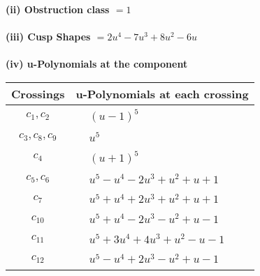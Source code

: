 \documentclass[1p]{elsarticle_modified}
\theoremstyle{definition}
\begin{document}
\flushleft \textbf{(ii) Obstruction class $= 1$}\\~\\
\flushleft \textbf{(iii) Cusp Shapes $= 2 u^4-7 u^3+8 u^2-6 u$}\\~\\
\newpage\renewcommand{\arraystretch}{1}
\flushleft \textbf{(iv) u-Polynomials at the component}\newline \\
\begin{tabular}{m{50pt}|m{274pt}}
Crossings & \hspace{64pt}u-Polynomials at each crossing \\
\hline $$\begin{aligned}c_{1},c_{2}\end{aligned}$$&$\begin{aligned}
&(u-1)^5
\end{aligned}$\\
\hline $$\begin{aligned}c_{3},c_{8},c_{9}\end{aligned}$$&$\begin{aligned}
&u^5
\end{aligned}$\\
\hline $$\begin{aligned}c_{4}\end{aligned}$$&$\begin{aligned}
&(u+1)^5
\end{aligned}$\\
\hline $$\begin{aligned}c_{5},c_{6}\end{aligned}$$&$\begin{aligned}
&u^5- u^4-2 u^3+u^2+u+1
\end{aligned}$\\
\hline $$\begin{aligned}c_{7}\end{aligned}$$&$\begin{aligned}
&u^5+u^4+2 u^3+u^2+u+1
\end{aligned}$\\
\hline $$\begin{aligned}c_{10}\end{aligned}$$&$\begin{aligned}
&u^5+u^4-2 u^3- u^2+u-1
\end{aligned}$\\
\hline $$\begin{aligned}c_{11}\end{aligned}$$&$\begin{aligned}
&u^5+3 u^4+4 u^3+u^2- u-1
\end{aligned}$\\
\hline $$\begin{aligned}c_{12}\end{aligned}$$&$\begin{aligned}
&u^5- u^4+2 u^3- u^2+u-1
\end{aligned}$\\
\hline
\end{tabular}\\~\\
\end{document}
